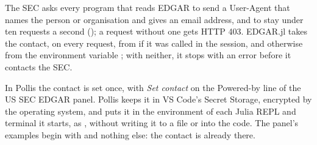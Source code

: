 The SEC asks every program that reads EDGAR to send a User-Agent that names the person or organisation and
gives an email address, and to stay under ten requests a second (); a request without one gets HTTP 403. EDGAR.jl takes the contact, on every request, from
 if it was called in the session, and otherwise from the environment variable
; with neither, it stops with an error before it contacts the SEC.

In Pollis the contact is set once, with \emph{Set contact} on the Powered-by line of the US SEC EDGAR panel.
Pollis keeps it in VS Code's Secret Storage, encrypted by the operating system, and puts it in the environment of
each Julia REPL and terminal it starts, as , without writing it to a file or into the
code. The panel's examples begin with  and nothing else: the contact is already there.

